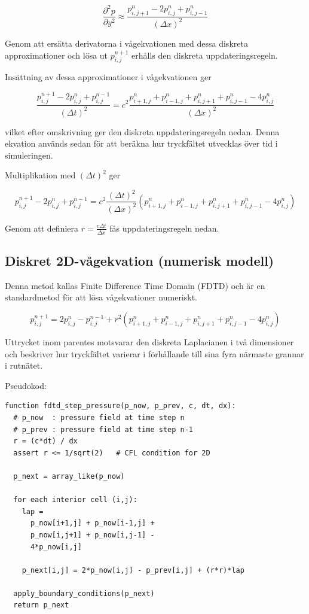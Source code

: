 \documentclass[11pt,a4paper]{article}
\begin{document}
\[
\frac{\partial^2 p}{\partial y^2}
\approx
\frac{p_{i,j+1}^n - 2p_{i,j}^n + p_{i,j-1}^n}{(\Delta x)^2}
\]

Genom att ersätta derivatorna i vågekvationen med dessa
diskreta approximationer och lösa ut $p_{i,j}^{n+1}$ erhålls
den diskreta uppdateringsregeln.

Insättning av dessa approximationer i vågekvationen ger

\[
\frac{p_{i,j}^{n+1}-2p_{i,j}^{n}+p_{i,j}^{n-1}}{(\Delta t)^2}
=
c^2
\frac{
p_{i+1,j}^n+p_{i-1,j}^n+p_{i,j+1}^n+p_{i,j-1}^n-4p_{i,j}^n
}{(\Delta x)^2}
\]

vilket efter omskrivning ger den diskreta uppdateringsregeln nedan.
Denna ekvation används sedan för att beräkna hur tryckfältet
utvecklas över tid i simuleringen.

Multiplikation med $(\Delta t)^2$ ger

\[
p_{i,j}^{n+1} - 2p_{i,j}^{n} + p_{i,j}^{n-1}
=
c^2 \frac{(\Delta t)^2}{(\Delta x)^2}
\left(
p_{i+1,j}^n + p_{i-1,j}^n + p_{i,j+1}^n + p_{i,j-1}^n - 4p_{i,j}^n
\right)
\]

Genom att definiera $r = \frac{c\Delta t}{\Delta x}$ fås uppdateringsregeln nedan.


\subsection{Diskret 2D-vågekvation (numerisk modell)}
Denna metod kallas Finite Difference Time Domain (FDTD)
och är en standardmetod för att lösa vågekvationer numeriskt.

\begin{equation}
p_{i,j}^{n+1}
=
2p_{i,j}^n - p_{i,j}^{n-1}
+
r^2
\left(
p_{i+1,j}^n + p_{i-1,j}^n
+
p_{i,j+1}^n + p_{i,j-1}^n
-
4p_{i,j}^n
\right)
\end{equation}

Uttrycket inom parentes motsvarar den diskreta
Laplacianen i två dimensioner och beskriver hur
tryckfältet varierar i förhållande till sina fyra
närmaste grannar i rutnätet.

Pseudokod:
\begin{lstlisting}[style=pseudocode]
function fdtd_step_pressure(p_now, p_prev, c, dt, dx):
  # p_now  : pressure field at time step n
  # p_prev : pressure field at time step n-1
  r = (c*dt) / dx
  assert r <= 1/sqrt(2)   # CFL condition for 2D

  p_next = array_like(p_now)

  for each interior cell (i,j):
    lap =
      p_now[i+1,j] + p_now[i-1,j] +
      p_now[i,j+1] + p_now[i,j-1] -
      4*p_now[i,j]

    p_next[i,j] = 2*p_now[i,j] - p_prev[i,j] + (r*r)*lap

  apply_boundary_conditions(p_next)
  return p_next
\end{lstlisting}
\end{document}
